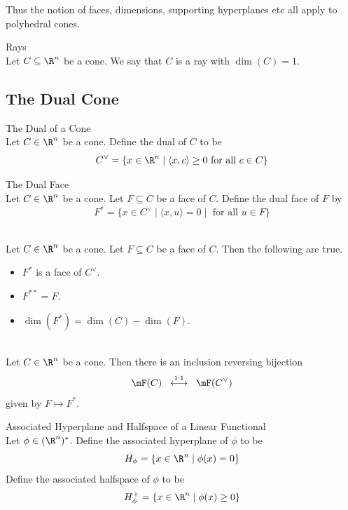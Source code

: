 \documentclass[a4paper]{article}
\begin{document}
Thus the notion of faces, dimensions, supporting hyperplanes etc all apply to polyhedral cones. 

\begin{defn}{Rays}{}\\
Let $C\subseteq\R^n$ be a cone. We say that $C$ is a ray with $\dim(C)=1$. 
\end{defn}

\subsection{The Dual Cone}
\begin{defn}{The Dual of a Cone}{}\\
Let $C\in\R^n$ be a cone. Define the dual of $C$ to be $$C^\vee=\{x\in\R^n\;|\;\langle x,c\rangle\geq 0\text{ for all }c\in C\}$$
\end{defn}

\begin{defn}{The Dual Face}{}\\
Let $C\in\R^n$ be a cone. Let $F\subseteq C$ be a face of $C$. Define the dual face of $F$ by $$F^\ast=\{x\in C^\vee\;|\;\langle x,u\rangle=0\;|\;\text{ for all }u\in F\}$$
\end{defn}

\begin{lmm}{}{}\\
Let $C\in\R^n$ be a cone. Let $F\subseteq C$ be a face of $C$. Then the following are true. 
\begin{itemize}
\item $F^\ast$ is a face of $C^\vee$. 
\item $F^{\ast\ast}=F$. 
\item $\dim(F^\ast)=\dim(C)-\dim(F)$. 
\end{itemize}
\end{lmm}

\begin{prp}{}{}\\
Let $C\in\R^n$ be a cone. Then there is an inclusion reversing bijection $$\mF(C)\;\;\overset{1:1}{\longleftrightarrow}\;\;\mF(C^\vee)$$ given by $F\mapsto F^\ast$. 
\end{prp}

\begin{defn}{Associated Hyperplane and Halfspace of a Linear Functional}{}\\
Let $\phi\in(\R^n)^\ast$. Define the associated hyperplane of $\phi$ to be $$H_\phi=\{x\in\R^n\;|\;\phi(x)=0\}$$ Define the associated halfspace of $\phi$ to be $$H_\phi^+=\{x\in\R^n\;|\;\phi(x)\geq 0\}$$
\end{defn}
\end{document}
